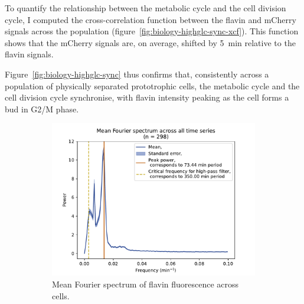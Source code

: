 To quantify the relationship between the metabolic cycle and the cell division cycle, I computed the cross-correlation function between the flavin and mCherry signals across the population (figure~\ref{fig:biology-highglc-sync-xcf}).
This function shows that the mCherry signals are, on average, shifted by \SI{5}{\minute} relative to the flavin signals.

Figure~\ref{fig:biology-highglc-sync} thus confirms that, consistently across a population of physically separated prototrophic cells, the metabolic cycle and the cell division cycle synchronise, with flavin intensity peaking as the cell forms a bud in G2/M phase.


\begin{figure}
  \centering
  \begin{subfigure}[htpb]{0.4\textwidth}
   \centering
   \includegraphics[width=\textwidth]{by4741_491_13}
   \caption{
    Mean Fourier spectrum of flavin fluorescence across cells.
   }
   \label{fig:biology-by4741-sync-fourier}
  \end{subfigure}%
  \begin{subfigure}[htpb]{0.4\textwidth}
   \centering

\end{subfigure}
\end{figure}
